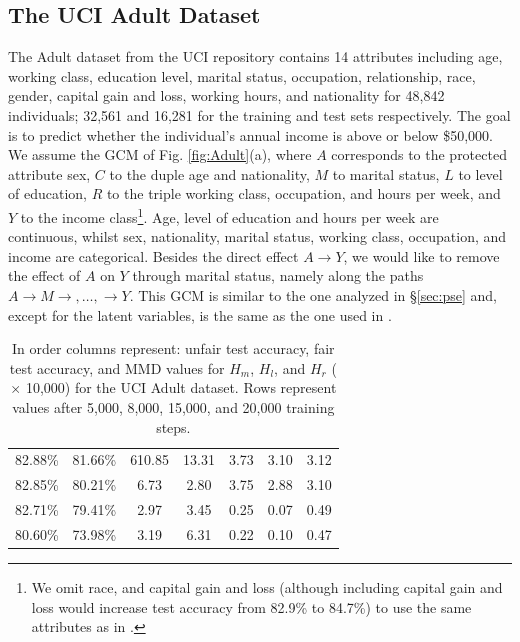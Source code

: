 \documentclass{article}
\newcommand{\figref}[1]{Fig. \ref{#1}}
\newcommand{\secref}[1]{\S \ref{#1}}
\begin{document}
\subsection{The UCI Adult Dataset\label{sec:AdultDataset}}
The Adult dataset from the UCI repository \cite{lichman13uci} contains 14 attributes including age, working class, education level, marital status, occupation,
relationship, race, gender, capital gain and loss, working hours, and nationality for 48,842 individuals; 32,561 and 16,281 for the training and test sets respectively. 
The goal is to predict whether the individual's annual income is above or below \$50,000. 
We assume the GCM of \figref{fig:Adult}(a), where $A$ corresponds to the protected attribute sex, $C$ to the duple age and nationality, 
$M$ to marital status, $L$ to level of education, $R$ to the triple working class, occupation, and hours per week, and $Y$ to the income class\footnote{We omit race, and capital gain and loss (although including capital gain and loss would increase test accuracy from 82.9\% to 84.7\%) to use the same attributes as in \citet{nabi18fair}.}.
Age, level of education and hours per week are continuous, whilst sex, nationality, marital status, working class, occupation, and income are categorical.
Besides the direct effect $A \rightarrow Y$, we would like to remove the effect of $A$ on $Y$ through marital
status, namely along the paths $A\rightarrow M \rightarrow,\ldots,\rightarrow Y$. 
This GCM is similar to the one analyzed in \secref{sec:pse} and, except for the latent variables, is the same as the one used in \citet{nabi18fair}.

\begin{table}[]
\caption{In order columns represent: unfair test accuracy, fair test accuracy, and MMD values for $H_m$, $H_l$, and $H_r$  ($\times$ 10,000) for the UCI Adult dataset. Rows represent values after 5,000, 8,000, 15,000, and 20,000 training steps.}
\label{tab:Adult}
\vskip0.25cm
\begin{center}
\begin{small}
\begin{tabular}{ccccccc}
\toprule
82.88\%  & 81.66\%  & 610.85  & 13.31  & 3.73 & 3.10 & 3.12\\
82.85\%  &  80.21\%  & 6.73 & 2.80  & 3.75  &   2.88  &3.10\\
82.71\%  &  79.41\%   & 2.97  & 3.45 & 0.25  &  0.07 & 0.49\\
80.60\%  &  73.98\%  &  3.19   & 6.31  & 0.22 &   0.10 & 0.47\\
\bottomrule
\end{tabular}
\end{small}
\end{center}
\end{table}
\end{document}

